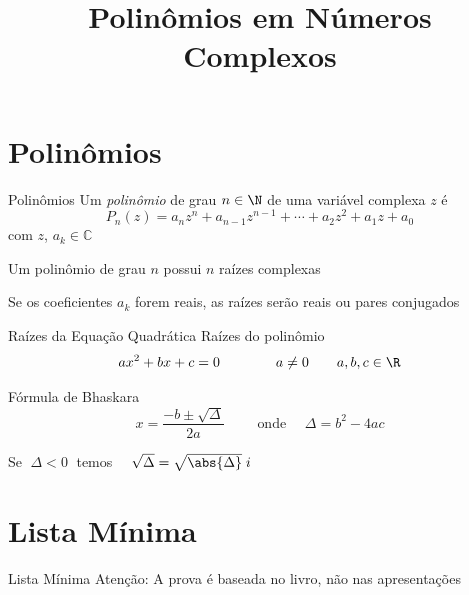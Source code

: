 \documentclass[fleqn,utf8,aspectratio=169,12pt,ignorenonframetext]{beamer}
\title{Polinômios em Números Complexos}
\begin{document}
\addtitle

\section{Polinômios}

\begin{frame}{Polinômios}
  Um \emph{polinômio} de grau $n\in\N$ de uma variável complexa $z$ \pause é
  \[
    P_n(z)
    = a_n z^n
    + a_{n-1} z^{n-1}
    + \cdots
    + a_2 z^2
    + a_1 z
    + a_0
  \]
  com \(z\), \(a_k\in\mathbb{C}\)

  \pause
  \vspace{\baselineskip}
  Um polinômio de grau $n$ possui $n$ raízes complexas

  \pause
  \vspace{\baselineskip}
  Se os coeficientes \(a_k\) forem reais, as raízes serão reais ou pares conjugados
\end{frame}

\begin{frame}{Raízes da Equação Quadrática}
  Raízes do polinômio
  \[
    ax^2 + bx + c = 0
    \qquad\qquad
    a\neq 0
    \qquad
    a, b, c \in \R
  \]

  \pause
  Fórmula de Bhaskara
  \[
    x = \dfrac{\displaystyle -b \pm \sqrt{\Delta}}{2a}
    \qquad\text{ onde }\quad
    \Delta = b^2 - 4 ac
  \]

  \pause
  Se \(\;\Delta<0\;\) temos
  \(\quad \sqrt{\Delta} = \sqrt{\abs{\Delta}}\;i \)
\end{frame}




\section{Lista Mínima}

\begin{frame}{Lista Mínima}
  Atenção: A prova é baseada no livro, não nas apresentações
\end{frame}

\end{document}
